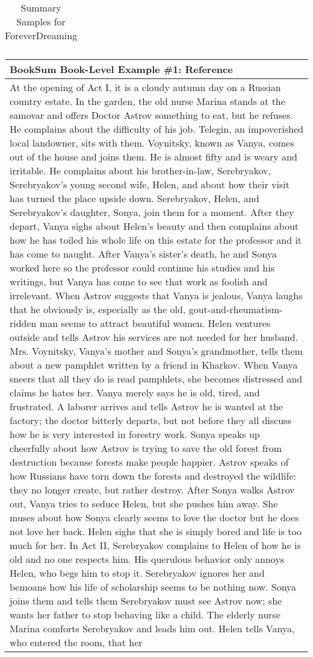 \begin{table}[!htbp]
\begin{tabular}{p{\linewidth}}
    \\
    \bottomrule
    \end{tabular}
    \caption{
    Summary Samples for ForeverDreaming
    }
\end{table}

\begin{table}[!htbp]
    \centering
    \tiny
    \begin{tabular}{p{\linewidth}} 
    \toprule
    \textbf{BookSum Book-Level Example \#1: Reference} \\
    \midrule
At the opening of Act I, it is a cloudy autumn day on a Russian country estate. In the garden, the old nurse Marina stands at the samovar and offers Doctor Astrov something to eat, but he refuses. He complains about the difficulty of his job. Telegin, an impoverished local landowner, sits with them. Voynitsky, known as Vanya, comes out of the house and joins them. He is almost fifty and is weary and irritable. He complains about his brother-in-law, Serebryakov, Serebryakov's young second wife, Helen, and about how their visit has turned the place upside down. Serebryakov, Helen, and Serebryakov's daughter, Sonya, join them for a moment. After they depart, Vanya sighs about Helen's beauty and then complains about how he has toiled his whole life on this estate for the professor and it has come to naught. After Vanya's sister's death, he and Sonya worked here so the professor could continue his studies and his writings, but Vanya has come to see that work as foolish and irrelevant. When Astrov suggests that Vanya is jealous, Vanya laughs that he obviously is, especially as the old, gout-and-rheumatism-ridden man seems to attract beautiful women. Helen ventures outside and tells Astrov his services are not needed for her husband. Mrs. Voynitsky, Vanya's mother and Sonya's grandmother, tells them about a new pamphlet written by a friend in Kharkov. When Vanya sneers that all they do is read pamphlets, she becomes distressed and claims he hates her. Vanya merely says he is old, tired, and frustrated. A laborer arrives and tells Astrov he is wanted at the factory; the doctor bitterly departs, but not before they all discuss how he is very interested in forestry work. Sonya speaks up cheerfully about how Astrov is trying to save the old forest from destruction because forests make people happier. Astrov speaks of how Russians have torn down the forests and destroyed the wildlife: they no longer create, but rather destroy. After Sonya walks Astrov out, Vanya tries to seduce Helen, but she pushes him away. She muses about how Sonya clearly seems to love the doctor but he does not love her back. Helen sighs that she is simply bored and life is too much for her. In Act II, Serebryakov complains to Helen of how he is old and no one respects him. His querulous behavior only annoys Helen, who begs him to stop it. Serebryakov ignores her and bemoans how his life of scholarship seems to be nothing now. Sonya joins them and tells them Serebryakov must see Astrov now; she wants her father to stop behaving like a child. The elderly nurse Marina comforts Serebryakov and leads him out. Helen tells Vanya, who entered the room, that her 
\end{tabular}
\end{table}
